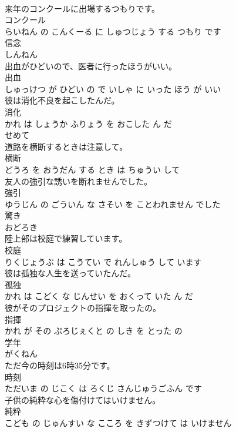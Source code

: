 \documentclass[8pt]{extreport}
\begin{document}
\begin{CJK}{UTF8}{min}
\\	来年のコンクールに出場するつもりです。	
\\	コンクール 
\\	らいねん の こんくーる に しゅつじょう する つもり です			
\\	信念	
\\	しんねん			
\\	出血がひどいので、医者に行ったほうがいい。	
\\	出血 
\\	しゅっけつ が ひどい の で いしゃ に いった ほう が いい			
\\	彼は消化不良を起こしたんだ。	
\\	消化 
\\	かれ は しょうか ふりょう を おこした ん だ			
\\	せめて	
\\	道路を横断するときは注意して。	
\\	横断 
\\	どうろ を おうだん する とき は ちゅうい して			
\\	友人の強引な誘いを断れませんでした。	
\\	強引 
\\	ゆうじん の ごういん な さそい を ことわれません でした			
\\	驚き	
\\	おどろき			
\\	陸上部は校庭で練習しています。	
\\	校庭 
\\	りくじょうぶ は こうてい で れんしゅう して います			
\\	彼は孤独な人生を送っていたんだ。	
\\	孤独 
\\	かれ は こどく な じんせい を おくって いた ん だ			
\\	彼がそのプロジェクトの指揮を取ったの。	
\\	指揮 
\\	かれ が その ぷろじぇくと の しき を とった の			
\\	学年	
\\	がくねん			
\\	ただ今の時刻は6時35分です。	
\\	時刻 
\\	ただいま の じこく は ろくじ さんじゅうごふん です			
\\	子供の純粋な心を傷付けてはいけません。	
\\	純粋 
\\	こども の じゅんすい な こころ を きずつけて は いけません			

\end{CJK}
\end{document}
